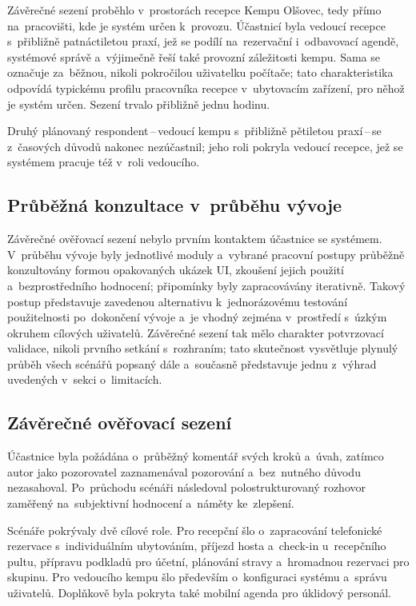 Závěrečné sezení proběhlo v~prostorách recepce Kempu Olšovec, tedy přímo na~pracovišti, kde je systém určen k~provozu.
Účastnicí byla vedoucí recepce s~přibližně patnáctiletou praxí, jež se podílí na~rezervační i~odbavovací agendě, systémové správě a~výjimečně řeší také provozní záležitosti kempu.
Sama se označuje za~běžnou, nikoli pokročilou uživatelku počítače; tato charakteristika odpovídá typickému profilu pracovníka recepce v~ubytovacím zařízení, pro něhož je systém určen.
Sezení trvalo přibližně jednu hodinu.

Druhý plánovaný respondent\,--\,vedoucí kempu s~přibližně pětiletou praxí\,--\,se z~časových důvodů nakonec nezúčastnil; jeho roli pokryla vedoucí recepce, jež se systémem pracuje též v~roli vedoucího.

\subsection{Průběžná konzultace v~průběhu vývoje}
\label{subsec:user-test-iterative}

Závěrečné ověřovací sezení nebylo prvním kontaktem účastnice se systémem.
V~průběhu vývoje byly jednotlivé moduly a~vybrané pracovní postupy průběžně konzultovány formou opakovaných ukázek UI, zkoušení jejich použití a~bezprostředního hodnocení; připomínky byly zapracovávány iterativně.
Takový postup představuje zavedenou alternativu k~jednorázovému testování použitelnosti po~dokončení vývoje a~je vhodný zejména v~prostředí s~úzkým okruhem cílových uživatelů.
Závěrečné sezení tak mělo charakter potvrzovací validace, nikoli prvního setkání s~rozhraním; tato skutečnost vysvětluje plynulý průběh všech scénářů popsaný dále a~současně představuje jednu z~výhrad uvedených v~sekci o~limitacích.

\subsection{Závěrečné ověřovací sezení}
\label{subsec:user-test-procedure}

Účastnice byla požádána o~průběžný komentář svých kroků a~úvah, zatímco autor jako pozorovatel zaznamenával pozorování a~bez~nutného důvodu nezasahoval.
Po~průchodu scénáři následoval polostrukturovaný rozhovor zaměřený na~subjektivní hodnocení a~náměty ke~zlepšení.

Scénáře pokrývaly dvě cílové role.
Pro recepční šlo o~zapracování telefonické rezervace s~individuálním ubytováním, příjezd hosta a~check-in u~recepčního pultu, přípravu podkladů pro účetní, plánování stravy a~hromadnou rezervaci pro skupinu.
Pro vedoucího kempu šlo především o~konfiguraci systému a~správu uživatelů.
Doplňkově byla pokryta také mobilní agenda pro úklidový personál.

